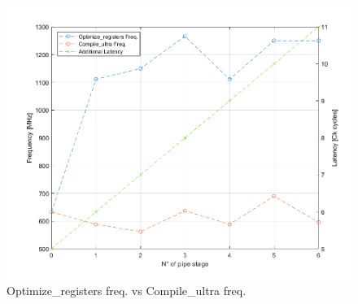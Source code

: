 \documentclass[a4paper, titlepage]{article}
\begin{document}
\begin{figure} [h]
\centering
\includegraphics[scale=0.5]{freq_comp.png}
	\caption{Optimize\_registers freq. vs Compile\_ultra freq. }
	\label{fig:freq_comp}
\end{figure}
\end{document}
